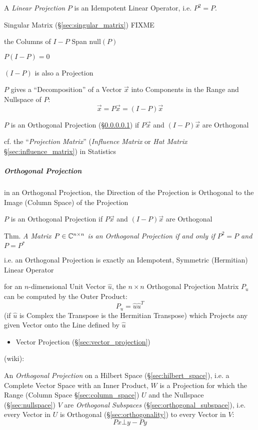 A \emph{Linear Projection} $P$ is an Idempotent Linear Operator, i.e. $P^2 = P$.

Singular Matrix (\S\ref{sec:singular_matrix}) FIXME

the Columns of $I - P$ Span $\mathrm{null}(P)$

$P(I - P) = 0$

$(I - P)$ is also a Projection

$P$ gives a ``Decomposition'' of a Vector $\vec{x}$ into Components in the
Range and Nullspace of $P$:
\[
  \vec{x} = P\vec{x} = (I - P)\vec{x}
\]

$P$ is an Orthogonal Projection (\S\ref{sec:orthogonal_projection}) if
$P\vec{x}$ and $(I-P)\vec{x}$ are Orthogonal

\fist cf. the ``\emph{Projection Matrix}'' (\emph{Influence Matrix} or \emph{Hat
  Matrix} \S\ref{sec:influence_matrix}) in Statistics



\subparagraph{Orthogonal Projection}\label{sec:orthogonal_projection}\hfill

in an Orthogonal Projection, the Direction of the Projection is Orthogonal to
the Image (Column Space) of the Projection

$P$ is an Orthogonal Projection if $P\vec{x}$ and $(I-P)\vec{x}$ are Orthogonal

Thm. \emph{A Matrix $P \in \mathbb{C}^{n \times n}$ is an Orthogonal Projection if
  and only if $P^2 = P$ and $P = P^*$}

i.e. an Orthogonal Projection is exactly an Idempotent, Symmetric (Hermitian)
Linear Operator

for an $n$-dimensional Unit Vector $\hat{u}$, the $n \times n$ Orthogonal
Projection Matrix $P_u$ can be computed by the Outer Product:
\[
  P_u = \hat{u}\hat{u}^T
\]
(if $\hat{u}$ is Complex the Transpose is the Hermitian Transpose) which
Projects any given Vector onto the Line defined by $\hat{u}$

\begin{itemize}
  \item Vector Projection (\S\ref{sec:vector_projection})
\end{itemize}

(wiki):

An \emph{Orthogonal Projection} on a Hilbert Space (\S\ref{sec:hilbert_space}),
i.e. a Complete Vector Space with an Inner Product,
$W$ is a Projection for which the Range (Column Space \S\ref{sec:column_space})
$U$ and the Nullspace (\S\ref{sec:nullspace}) $V$ are \emph{Orthogonal
  Subspaces} (\S\ref{sec:orthogonal_subspace}), i.e. every Vector in $U$ is
Orthogonal (\S\ref{sec:orthogonality}) to every Vector in $V$:
\[
  Px \bot y - Py
\]

